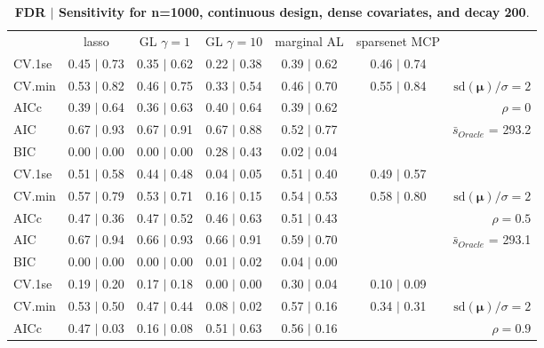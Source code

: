 \begin{table}\vspace{-.5cm}
\caption[l]{ {\it }
{ \bf FDR $\boldsymbol{\mid}$ Sensitivity for n=1000, continuous design, dense covariates, and  decay  200}.}
\vspace{-.5cm}
\footnotesize{}
\begin{center}
\begin{tabular}{l*{5}{c}|r}
 & lasso & GL $\gamma=1$ & GL $\gamma=10$ & marginal AL & sparsenet MCP  & \\
 \cline{1-7}
CV.1se & 0.45 $\mid$ 0.73 & 0.35 $\mid$ 0.62 & 0.22 $\mid$ 0.38 & 0.39 $\mid$ 0.62 & 0.46 $\mid$ 0.74 & \\
CV.min & 0.53 $\mid$ 0.82 & 0.46 $\mid$ 0.75 & 0.33 $\mid$ 0.54 & 0.46 $\mid$ 0.70 & 0.55 $\mid$ 0.84 &  $\mathrm{sd}(\mathbf{\mu})/\sigma=2$ \\
AICc & 0.39 $\mid$ 0.64 & 0.36 $\mid$ 0.63 & 0.40 $\mid$ 0.64 & 0.39 $\mid$ 0.62 & & $\rho=0$ \\
AIC & 0.67 $\mid$ 0.93 & 0.67 $\mid$ 0.91 & 0.67 $\mid$ 0.88 & 0.52 $\mid$ 0.77 & &  \multirow{2}{*}{$\bar{s}_{Oracle}$ = 293.2} \\
BIC & 0.00 $\mid$ 0.00 & 0.00 $\mid$ 0.00 & 0.28 $\mid$ 0.43 & 0.02 $\mid$ 0.04 & &  \\
 \hline 
CV.1se & 0.51 $\mid$ 0.58 & 0.44 $\mid$ 0.48 & 0.04 $\mid$ 0.05 & 0.51 $\mid$ 0.40 & 0.49 $\mid$ 0.57 & \\
CV.min & 0.57 $\mid$ 0.79 & 0.53 $\mid$ 0.71 & 0.16 $\mid$ 0.15 & 0.54 $\mid$ 0.53 & 0.58 $\mid$ 0.80 &  $\mathrm{sd}(\mathbf{\mu})/\sigma=2$ \\
AICc & 0.47 $\mid$ 0.36 & 0.47 $\mid$ 0.52 & 0.46 $\mid$ 0.63 & 0.51 $\mid$ 0.43 & & $\rho=0.5$ \\
AIC & 0.67 $\mid$ 0.94 & 0.66 $\mid$ 0.93 & 0.66 $\mid$ 0.91 & 0.59 $\mid$ 0.70 & &  \multirow{2}{*}{$\bar{s}_{Oracle}$ = 293.1} \\
BIC & 0.00 $\mid$ 0.00 & 0.00 $\mid$ 0.00 & 0.01 $\mid$ 0.02 & 0.04 $\mid$ 0.00 & &  \\
 \hline 
CV.1se & 0.19 $\mid$ 0.20 & 0.17 $\mid$ 0.18 & 0.00 $\mid$ 0.00 & 0.30 $\mid$ 0.04 & 0.10 $\mid$ 0.09 & \\
CV.min & 0.53 $\mid$ 0.50 & 0.47 $\mid$ 0.44 & 0.08 $\mid$ 0.02 & 0.57 $\mid$ 0.16 & 0.34 $\mid$ 0.31 &  $\mathrm{sd}(\mathbf{\mu})/\sigma=2$ \\
AICc & 0.47 $\mid$ 0.03 & 0.16 $\mid$ 0.08 & 0.51 $\mid$ 0.63 & 0.56 $\mid$ 0.16 & & $\rho=0.9$ \\

\end{tabular}
\end{center}
\end{table}
